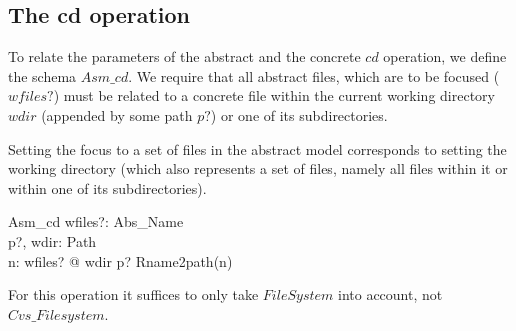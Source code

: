 
\subsection{The cd operation}

To relate the parameters of the abstract and the concrete $cd$ operation, we
define the schema $Asm\_cd$.  We require that all abstract files, which are to
be focused ($wfiles?$) must be related to a concrete file within the current
working directory $wdir$ (appended by some path $p?$) or one of its
subdirectories.

Setting the focus to a set of files in the abstract model corresponds to setting
the working directory (which also represents a set of files, namely all files
within it or within one of its subdirectories).
\begin{schema}{Asm\_cd}
  wfiles?: \power Abs\_Name \\
  p?, wdir: Path \\
  \where
  \forall n: wfiles? @ wdir \cat p? \prefix Rname2path(n) \\
\end{schema}
\noindent For this operation it suffices to only take $FileSystem$ into account,
not $Cvs\_Filesystem$.






